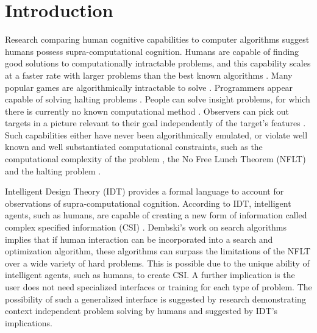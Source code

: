 \section{Introduction}
Research comparing human cognitive capabilities to computer algorithms suggest humans possess supra-computational cognition.  Humans are capable of finding good solutions to computationally intractable problems, and this capability scales at a faster rate with larger problems than the best known algorithms .  Many popular games are algorithmically intractable to solve \citep{viglietta11:_gamin_is_hard_job_but}.  Programmers appear capable of solving halting problems \citep{bartlett11:_calcul_softw_compl_using_haltin_probl}.  People can solve insight problems, for which there is currently no known computational method \citep{bartlett11:_using_turin_oracl_in_cognit_model}.  Observers can pick out targets in a picture relevant to their goal independently of the target's features .  Such capabilities either have never been algorithmically emulated, or violate well known and well substantiated computational constraints, such as the computational complexity of the problem , the No Free Lunch Theorem (NFLT) \citep{wolpert96:_no_free_lunch_theor_for_optim,wolpert95:_no_free_lunch_theor_for_searc} and the halting problem \citep{cover06:_elemen_of_infor_theor}. 

Intelligent Design Theory (IDT) provides a formal language to account for observations of supra-computational cognition.  According to IDT, intelligent agents, such as humans, are capable of creating a new form of information called complex specified information (CSI) \citep{dembski:_specif}. Dembski's work on search algorithms \citep{dembski06:_conser_of_infor_in_searc} implies that if human interaction can be incorporated into a search and optimization algorithm, these algorithms can surpass the limitations of the NFLT  over a wide variety of hard problems.  This is possible due to the unique ability of intelligent agents, such as humans, to create CSI.  A further implication is the user does not need specialized interfaces or training for each type of problem.  The possibility of such a generalized interface is suggested by research demonstrating context independent problem solving by humans  and suggested by IDT's implications.

